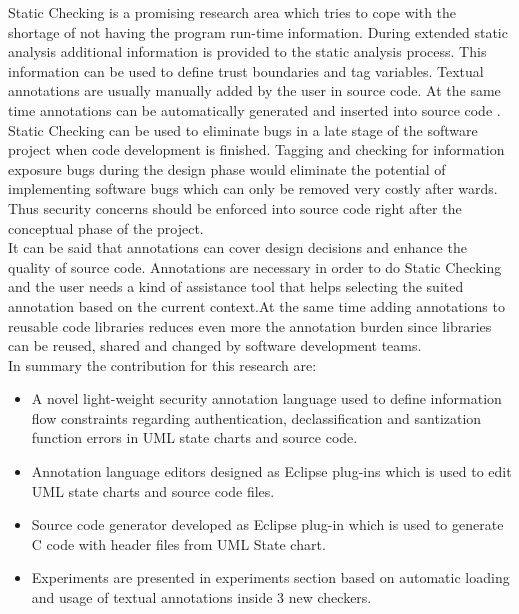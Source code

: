 Static Checking is a promising research area which tries to cope with the shortage of not having the program run-time information. During extended static analysis additional information is provided to the static analysis process. This information can be used to define trust boundaries and tag variables. Textual annotations are usually manually added by the user in source code. At the same time annotations can be automatically generated and inserted into source code . Static Checking can be used to eliminate bugs in a late stage of the software project when code development is finished. Tagging and checking for information exposure bugs during the design phase would eliminate the potential of implementing software bugs which can only be removed very costly after wards. Thus security concerns should be enforced into source code right after the conceptual phase of the project. \\

It can be said that annotations can cover design decisions and enhance the quality of source code. Annotations are necessary in order to do Static Checking and the user needs a kind of assistance tool that helps selecting the suited annotation based on the current context.At the same time adding annotations to reusable code libraries reduces even more the annotation burden since libraries can be reused, shared and changed by software development teams.\\

In summary the contribution for this research are:
\begin{itemize}
 \item A novel light-weight security annotation language
	used to define information flow constraints regarding authentication, declassification and santization function errors  in UML state charts and source code.
	
\item Annotation language editors designed as Eclipse
	plug-ins which is used to edit UML state charts and
	source code files.
	
\item Source code generator developed as Eclipse plug-in which is used to generate C code with header files from UML State chart.
	
\item Experiments are presented in experiments section based on
	automatic loading and usage of textual annotations
	inside 3 new checkers.
	
\end{itemize}

 


